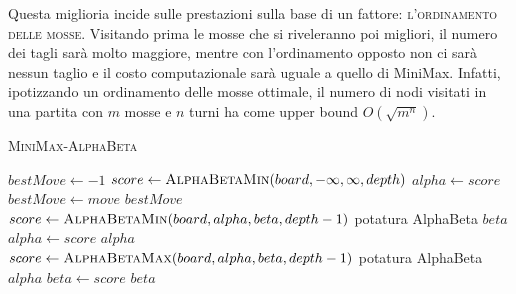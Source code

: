 \documentclass{article}
\begin{document}
Questa miglioria incide sulle prestazioni sulla base di un fattore: \textsc{l'ordinamento delle mosse}.
Visitando prima le mosse che si riveleranno poi migliori, il numero dei tagli sarà molto maggiore,
mentre con l'ordinamento opposto non ci sarà nessun taglio e il costo computazionale sarà uguale a 
quello di MiniMax. Infatti, ipotizzando un ordinamento delle mosse ottimale, il numero di nodi visitati
in una partita con $m$ mosse e $n$ turni ha come upper bound $O(\sqrt{m^n})$.
\pagebreak

\begin{algorithm}[H]
    \caption{\textsc{MiniMax-AlphaBeta}}
    \label{alg:minimax}
    \begin{algorithmic}[H]
        \State $bestMove \gets -1$
            \State $score \gets \Call{AlphaBetaMin}{board,-\infty,\infty,depth}$
              \State $alpha \gets score$
              \State $bestMove \gets move$
            \EndIf
      \EndFor
      \State \Return $bestMove$
      \EndProcedure \\
          \State \Return {}
        \EndIf
            \State $score \gets \Call{AlphaBetaMin}{board,alpha,beta,depth-1}$
            \Comment potatura AlphaBeta
              \State \Return $beta$
            \EndIf
              \State $alpha \gets score$
            \EndIf
      \EndFor
      \State \Return $alpha$
      \EndProcedure \\
          \State \Return {}
        \EndIf
            \State $score \gets \Call{AlphaBetaMax}{board,alpha,beta,depth-1}$
            \Comment potatura AlphaBeta
              \State \Return $alpha$
            \EndIf
              \State $beta \gets score$
            \EndIf
      \EndFor
      \State \Return $beta$
      \EndProcedure
    \end{algorithmic}
  \end{algorithm}
\end{document}
